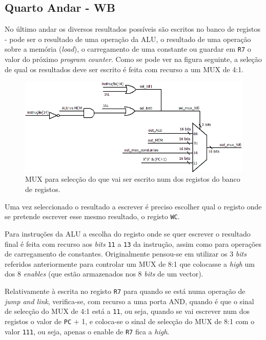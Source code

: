 \documentclass[11pt]{article}
\numberwithin{equation}{section}
\begin{document}
\subsection{Quarto Andar - WB}
\label{sec:WB}

No último andar os diversos resultados possíveis são escritos no banco de registos - pode ser o resultado de uma operação da ALU, o resultado de uma operação sobre a memória (\textit{load}), o carregamento de uma constante ou guardar em \texttt{R7} o valor do próximo \textit{program counter}. Como se pode ver na figura seguinte, a seleção de qual os resultados deve ser escrito é feita com recurso a um MUX de 4:1. 

\begin{figure}[h]
	\centering
	\includegraphics[keepaspectratio=true, scale=0.5]{imagens/WB1}
	\caption{MUX para selecção do que vai ser escrito num dos registos do banco de registos.}
	\vspace{-0.8em}
	\label{fig:MuxReg}
\end{figure}

Uma vez seleccionado o resultado a escrever é preciso escolher qual o registo onde se pretende escrever esse mesmo resultado, o registo \texttt{WC}. 

Para instruções da ALU a escolha do registo onde se quer escrever o resultado final é feita com recurso aos \textit{bits} \texttt{11} a \texttt{13} da instrução, assim como para operações de carregamento de constantes. Originalmente pensou-se em utilizar os 3 \textit{bits} referidos anteriormente para controlar um MUX de 8:1 que colocasse a \textit{high} um dos 8 \textit{enables} (que estão armazenados nos 8 \textit{bits} de um vector).

Relativamente à escrita no registo \texttt{R7} para quando se está numa operação de \textit{jump and link}, verifica-se, com recurso a uma porta AND, quando é que o sinal de selecção do MUX de 4:1 está a \texttt{11}, ou seja, quando se vai escrever num dos registos o valor de \texttt{PC} $+$ 1, e coloca-se o sinal de selecção do MUX de 8:1 com o valor \texttt{111}, ou seja, apenas o enable de \texttt{R7} fica a \textit{high}.
\end{document}
